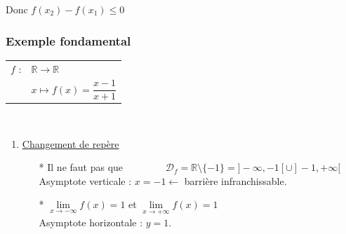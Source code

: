 \begin{itemize}
\renewcommand{\arraystretch }{1}

Donc $f(x_2) - f(x_1) \leqslant 0 $ \\
\end{itemize}
\subsubsection{Exemple fondamental}


\begin{tabular}{l@{$\;$ }l}
  $f$ : & $ \mathbb{R} \longrightarrow \mathbb{R}$  \\
        & $ x \longmapsto f(x) = \dfrac{x - 1}{x + 1}$ \\
\end{tabular}\\


\begin{enumerate}
\renewcommand{\theenumi}{\alph{enumi})}
\item \underline{Changement de repère}

\begin{itemize}
\item [*] Il ne faut pas que  
            $ \qquad \qquad 
                    \mathscr{D}_f = \mathbb{R}\setminus\!\!\{-1\} = ] -\infty,-1[\cup]-1, +\infty [ $ \\
                    
Asymptote verticale : $x = -1\longleftarrow $ barrière infranchissable.\\

\item[*] $\lim\limits_{x \to -\infty} f(x) = 1 $ 
        et  $\lim\limits_{x \to +\infty} f(x) = 1 $ \\
        
  Asymptote horizontale : $y = 1$.   \\   
 
  
\centerline{ }    


\end{itemize}
\end{enumerate}
